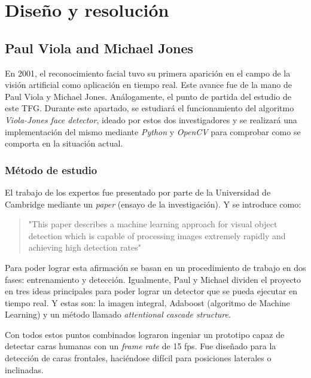 
\chapter{Diseño y resolución}


\section{Paul Viola and Michael Jones} \label{haar-like}

En 2001, el reconocimiento facial tuvo su primera aparición en el campo de la visión artificial como aplicación en tiempo real. Este avance fue de la mano de Paul Viola y Michael Jones. Análogamente, el punto de partida del estudio de este TFG. Durante este apartado, se estudiará el funcionamiento del algoritmo \textit{Viola-Jones face detector}, ideado por estos dos investigadores y se realizará una implementación del mismo mediante \textit{Python} y \textit{OpenCV} para comprobar como se comporta en la situación actual.

\subsection*{Método de estudio}

El trabajo de los expertos fue presentado por parte de la Universidad de Cambridge mediante un \textit{paper} (ensayo de la investigación). Y se introduce como: 
\begin{quote}
	"This paper describes a machine learning approach for visual object detection which is capable of processing images extremely rapidly and achieving high detection rates" \cite{paulViola}
\end{quote}

Para poder lograr esta afirmación se basan en un procedimiento de trabajo en dos fases: entrenamiento y detección. Igualmente, Paul y Michael dividen el proyecto en tres ideas principales para poder lograr un detector que se pueda ejecutar en tiempo real. Y estas son: la imagen integral, Adaboost (algoritmo de Machine Learning) y un método llamado \textit{attentional cascade structure}. 

Con todos estos puntos combinados lograron ingeniar un prototipo capaz de detectar caras humanas con un \textit{frame rate} de 15 fps. Fue diseñado para la detección de caras frontales, haciéndose difícil para posiciones laterales o inclinadas.

